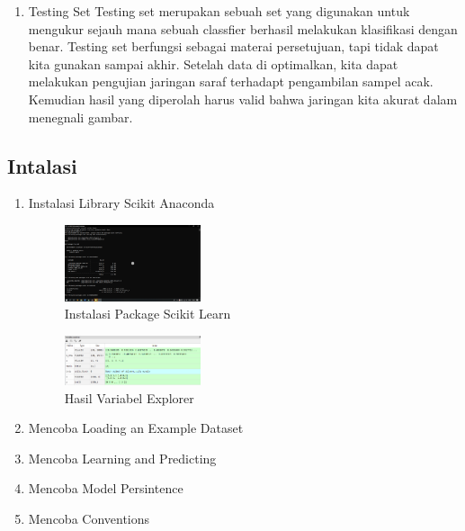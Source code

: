 \begin{enumerate}
\item Testing Set
Testing set merupakan sebuah set yang digunakan untuk mengukur sejauh mana sebuah classfier berhasil melakukan klasifikasi dengan benar. Testing set berfungsi sebagai materai persetujuan, tapi tidak dapat kita gunakan sampai akhir. Setelah data di optimalkan, kita dapat melakukan pengujian jaringan saraf terhadapt pengambilan sampel acak. Kemudian hasil yang diperolah harus valid bahwa jaringan kita akurat dalam menegnali gambar.\\

\end{enumerate}

\subsection{Intalasi}
\begin{enumerate}
\item Instalasi  Library Scikit Anaconda
	\hfill\break
	\begin{figure}[H]
		\includegraphics[width=4cm]{figures/1174015/1.PNG}
		\centering
		\caption{Instalasi Package Scikit Learn}
	\end{figure}
	\begin{figure}[H]
		\includegraphics[width=4cm]{figures/1174015/2.PNG}
		\centering
		\caption{Hasil Variabel Explorer}
	\end{figure}
\item Mencoba Loading an Example Dataset
\hfill\break
	
\item Mencoba Learning and Predicting
\hfill\break
	
\item Mencoba Model Persintence
\hfill\break
	
\item Mencoba Conventions
\hfill\break
	


\end{enumerate}
